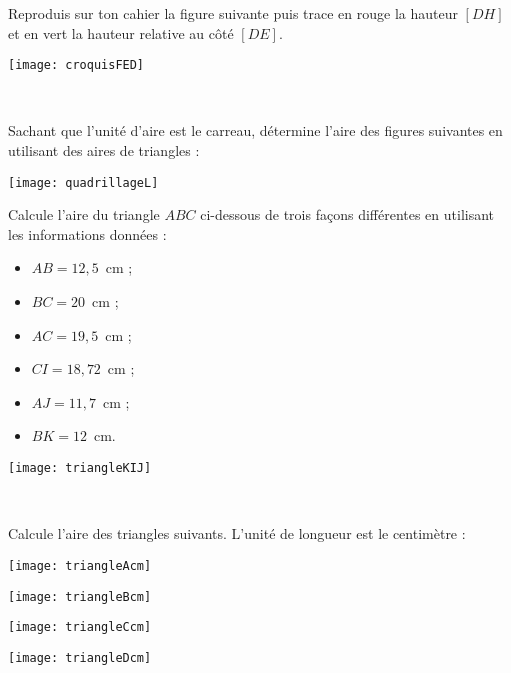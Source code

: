 \begin{exercice}
\begin{minipage}[c]{0.48\linewidth}
Reproduis sur ton cahier la figure suivante puis trace en rouge la hauteur $[DH]$ et en vert la hauteur relative au côté $[DE]$.
 \end{minipage} \hfill%
 \begin{minipage}[c]{0.48\linewidth}
\begin{center} \texttt{[image: croquisFED]} \end{center} 
  \end{minipage} \\
\end{exercice}


\begin{exercice}
Sachant que l'unité d'aire est le carreau, détermine l'aire des figures suivantes en utilisant des aires de triangles :
\begin{center} \texttt{[image: quadrillageL]} \end{center} 
\end{exercice}


\begin{exercice}
Calcule l'aire du triangle $ABC$ ci-dessous de trois façons différentes en utilisant les informations données :

\begin{minipage}[c]{0.38\linewidth}
\begin{itemize}
 \item $AB = 12,5$ cm ;
 \item $BC = 20$ cm ;
 \item $AC = 19,5$ cm ;
 \item $CI = 18,72$ cm ;
 \item $AJ = 11,7$ cm ;
 \item $BK = 12$ cm.
 \end{itemize}
 \end{minipage} \hfill%
 \begin{minipage}[c]{0.58\linewidth}
\begin{center} \texttt{[image: triangleKIJ]} \end{center} 
  \end{minipage} \\
\end{exercice}


\begin{exercice}
Calcule l'aire des triangles suivants. L'unité de longueur est le centimètre :
\begin{colenumerate}{2}
 \item 
 
 \texttt{[image: triangleAcm]}
  \item 
 
 \texttt{[image: triangleBcm]}
  \item 
 
 \texttt{[image: triangleCcm]}
  \item 
 
 \texttt{[image: triangleDcm]}
 \end{colenumerate}
\end{exercice}



